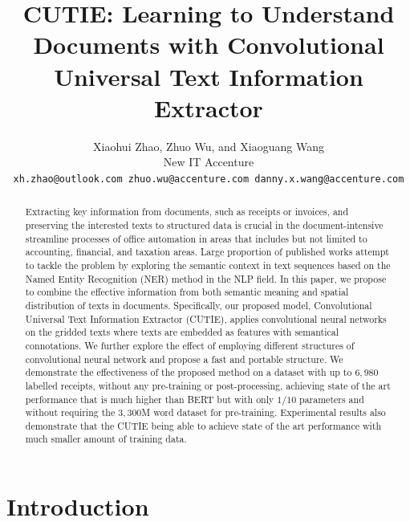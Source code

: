 \documentclass[10pt,twocolumn,letterpaper]{article}
\begin{document}
\title{CUTIE: Learning to Understand Documents with Convolutional Universal Text Information Extractor}

\author{
  Xiaohui Zhao, Zhuo Wu, and Xiaoguang Wang \\
  New IT Accenture \\
{\tt\small xh.zhao@outlook.com zhuo.wu@accenture.com danny.x.wang@accenture.com}
}

\maketitle

\begin{abstract}
   Extracting key information from documents, such as receipts or invoices, and preserving the interested texts to structured data is crucial in the document-intensive streamline processes of office automation in areas that includes but not limited to accounting, financial, and taxation areas. Large proportion of published works attempt to tackle the problem by exploring the semantic context in text sequences based on the Named Entity Recognition (NER) method in the NLP field. In this paper, we propose to combine the effective information from both semantic meaning and spatial distribution of texts in documents. Specifically, our proposed model, Convolutional Universal Text Information Extractor (CUTIE), applies convolutional neural networks on the gridded texts where texts are embedded as features with semantical connotations. We further explore the effect of employing different structures of convolutional neural network and propose a fast and portable structure. We demonstrate the effectiveness of the proposed method on a dataset with up to $6,980$ labelled receipts, without any pre-training or post-processing, achieving state of the art performance that is much higher than BERT but with only $1/10$ parameters and without requiring the $3,300$M word dataset for pre-training. Experimental results also demonstrate that the CUTIE being able to achieve state of the art performance with much smaller amount of training data.
\end{abstract}

\section{Introduction}
\end{document}
